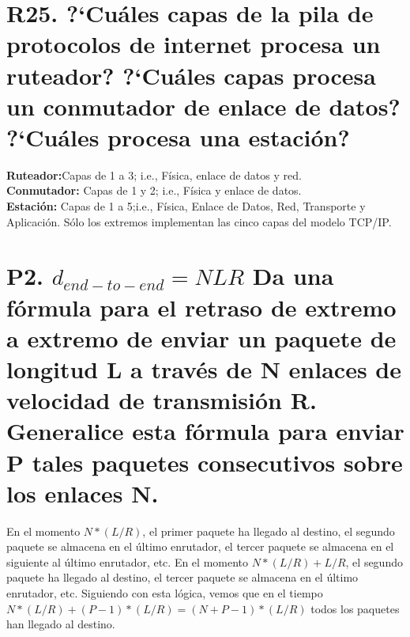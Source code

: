 \documentclass[a4paper, 11pt]{article}
\theoremstyle{definition} \theoremstyle{remark}
\begin{document}
     \section{R25. ?`Cu\'ales capas de la pila de protocolos de internet procesa un ruteador? ?`Cu\'ales capas procesa un conmutador de enlace de datos? ?`Cu\'ales procesa una estaci\'on?}
     \begin{flushleft}
       \textbf{Ruteador:}Capas de 1 a 3; i.e., F\'isica, enlace de datos y red.\\
       \textbf{Conmutador:} Capas de 1 y 2; i.e., F\'isica y enlace de datos.\\
       \textbf{Estaci\'on:} Capas de 1 a 5;i.e., F\'isica, Enlace de Datos, Red, Transporte y Aplicaci\'on. S\'olo los extremos implementan las cinco capas del modelo TCP/IP.
     \end{flushleft}



     \maketitle
     \section{P2. $d_{end-to-end}=NLR$ Da una f\'ormula para el retraso de extremo a extremo de enviar un paquete de longitud L a trav\'es de N enlaces de velocidad de transmisi\'on R. Generalice esta f\'ormula para enviar P tales paquetes consecutivos sobre los enlaces N.}

     En el momento $N * (L / R)$, el primer paquete ha llegado al destino, el segundo paquete se almacena en el \'ultimo enrutador, el tercer paquete se almacena en el siguiente al \'ultimo enrutador, etc. En el momento $N * (L / R) + L / R$, el segundo paquete ha llegado al destino, el tercer paquete se almacena en el \'ultimo enrutador, etc. Siguiendo con esta l\'ogica, vemos que en el tiempo $N * (L / R) + (P-1) * (L / R) = (N + P - 1) * (L / R)$ todos los paquetes han llegado al destino.
\end{document}

